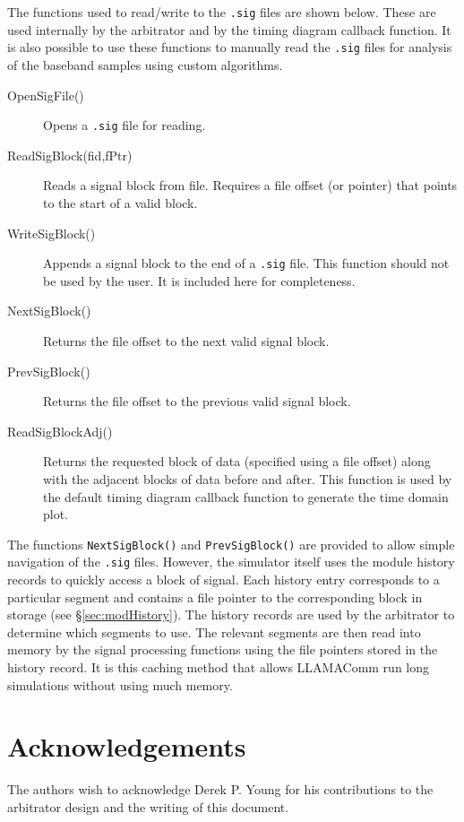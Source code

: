 The functions used to read/write to the \verb+.sig+ files are shown
below.  These are used internally by the arbitrator and by the
timing diagram callback function. It is also possible to use these
functions to manually read the \verb+.sig+ files for analysis of the
baseband samples using custom algorithms.

\begin{description}
\item[OpenSigFile()] Opens a \verb+.sig+ file for reading.

\item[ReadSigBlock(fid,fPtr)] Reads a signal block from file.
Requires a file offset (or pointer) that points to the start of a
valid block.

\item[WriteSigBlock()] Appends a signal block to the end of a
\verb+.sig+ file.  This function should not be used by the user.  It
is included here for completeness.

\item[NextSigBlock()] Returns the file offset to the next valid
signal block.

\item[PrevSigBlock()] Returns the file offset to the previous valid
signal block.

\item[ReadSigBlockAdj()] Returns the requested block of data
(specified using a file offset) along with the adjacent blocks of
data before and after.  This function is used by the default timing
diagram callback function to generate the time domain plot.
\end{description}

The functions \verb+NextSigBlock()+ and \verb+PrevSigBlock()+ are
provided to allow simple navigation of the \verb+.sig+ files.
However, the simulator itself uses the module history records to
quickly access a block of signal.  Each history entry corresponds to
a particular segment and contains a file pointer to the
corresponding block in storage (see \S\ref{sec:modHistory}). The
history records are used by the arbitrator to determine which
segments to use. The relevant segments are then read into memory by
the signal processing functions using the file pointers stored in
the history record.  It is this caching method that allows LLAMAComm
run long simulations without using much memory.

\section{Acknowledgements}
The authors wish to acknowledge Derek P. Young for his contributions to the arbitrator design and the writing of this document.
